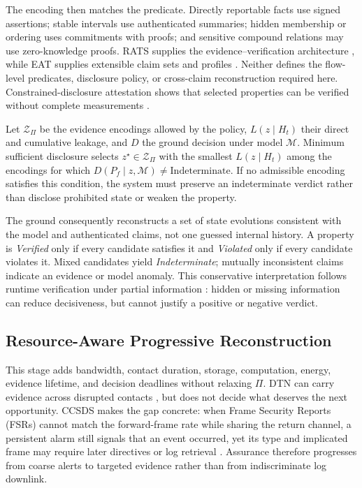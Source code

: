 \documentclass[journal]{IEEEtran}
\begin{document}
The encoding then matches the predicate. Directly reportable facts use signed
assertions; stable intervals use authenticated summaries; hidden membership or
ordering uses commitments with proofs; and sensitive compound relations may use
zero-knowledge proofs. RATS supplies the evidence--verification architecture
\cite{rfc9334rats}, while EAT supplies extensible claim sets and profiles
\cite{rfc9711eat}. Neither defines the flow-level predicates, disclosure policy,
or cross-claim reconstruction required here. Constrained-disclosure attestation
shows that selected properties can be verified without complete measurements
\cite{eckel2023racd}.

Let \(\mathcal{Z}_{\Pi}\) be the evidence encodings allowed by the policy,
\(L(z\mid H_t)\) their direct and cumulative leakage, and \(D\) the ground
decision under model \(\mathcal{M}\). Minimum sufficient disclosure selects
\(z^{\star}\in\mathcal{Z}_{\Pi}\) with the smallest
\(L(z\mid H_t)\) among the encodings for which
\(D(P_f\mid z,\mathcal{M})\ne\mathrm{Indeterminate}\). If no admissible
encoding satisfies this condition, the system must preserve an indeterminate
verdict rather than disclose prohibited state or weaken the property.

The ground consequently reconstructs a set of state evolutions consistent with
the model and authenticated claims, not one guessed internal history. A property
is \emph{Verified} only if every candidate satisfies it and \emph{Violated} only
if every candidate violates it. Mixed candidates yield \emph{Indeterminate};
mutually inconsistent claims indicate an evidence or model anomaly. This
conservative interpretation follows runtime verification under partial
information \cite{leucker2019partial}: hidden or missing information can reduce
decisiveness, but cannot justify a positive or negative verdict.

\subsection{Resource-Aware Progressive Reconstruction}
This stage adds bandwidth, contact duration, storage, computation, energy,
evidence lifetime, and decision deadlines without relaxing \(\Pi\). DTN can
carry evidence across disrupted contacts \cite{rfc9171bpv7}, but does not decide
what deserves the next opportunity. CCSDS makes the gap concrete: when Frame
Security Reports (FSRs) cannot match the forward-frame rate while sharing the
return channel, a persistent alarm still signals that an event occurred, yet
its type and implicated frame may require later directives or log retrieval
\cite{ccsds2024sdlsepgreen}. Assurance therefore progresses from coarse alerts
to targeted evidence rather than from indiscriminate log downlink.
\end{document}
